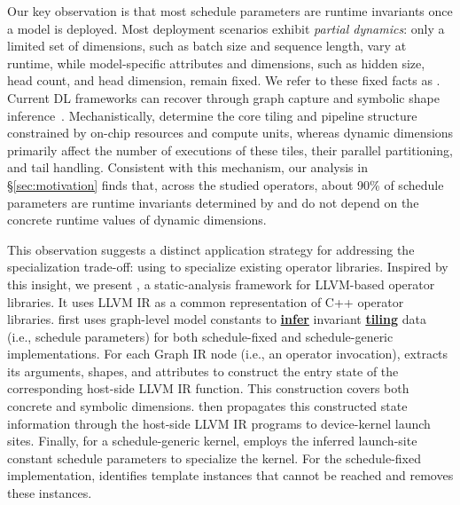 Our key observation is that most schedule parameters are runtime invariants once a model is deployed. Most deployment scenarios exhibit \emph{partial dynamics}: only a limited set of dimensions, such as batch size and sequence length, vary at runtime, while model-specific attributes and dimensions, such as hidden size, head count, and head dimension, remain fixed. We refer to these fixed facts as \initialconsts. Current DL frameworks can recover \initialconsts through graph capture and symbolic shape inference~\cite{shen2021nimble,zheng2023bladedisc,Lai2023RelaxCA,ansel2024dynamo}. Mechanistically, \initialconsts determine the core tiling and pipeline structure constrained by on-chip resources and compute units, whereas dynamic dimensions primarily affect the number of executions of these tiles, their parallel partitioning, and tail handling. 
Consistent with this mechanism, our analysis in \S\ref{sec:motivation} finds that, across the studied operators, about 90\% of schedule parameters are runtime invariants determined by \initialconsts and do not depend on the concrete runtime values of dynamic dimensions.

This observation suggests a distinct application strategy for addressing the specialization trade-off: using \initialconsts to specialize existing operator libraries.
Inspired by this insight, we present \textbf{\uline{\mysys{}}}, a static-analysis framework for LLVM-based operator libraries.
It uses LLVM IR as a common representation of C++ operator libraries.
\mysys first uses graph-level model constants to \textbf{\uline{infer}} invariant \textbf{\uline{tiling}} data (i.e., schedule parameters) for both schedule-fixed and schedule-generic implementations.
For each Graph IR node (i.e., an operator invocation), \mysys extracts its arguments, shapes, and attributes to construct the entry state of the corresponding host-side LLVM IR function.
This construction covers both concrete and symbolic dimensions.
\mysys then propagates this constructed state information through the host-side LLVM IR programs to device-kernel launch sites.
Finally, for a schedule-generic kernel, \mysys employs the inferred launch-site constant schedule parameters to specialize the kernel.
For the schedule-fixed implementation, \mysys identifies template instances that cannot be reached and removes these instances.

